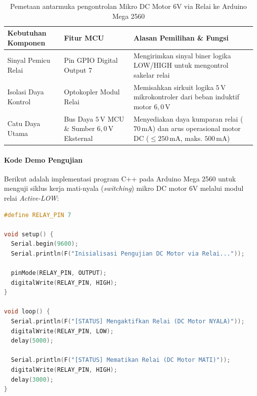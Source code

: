 \begin{table}[H]
	\centering
	\caption{Pemetaan antarmuka pengontrolan Mikro DC Motor 6V via Relai ke Arduino Mega 2560}
	\label{tab:dc_motor_relay_mcu_mapping}
	\small
	\begin{tabularx}{\textwidth}{@{} p{3.5cm} p{3.8cm} X @{}}
		\toprule
		Kebutuhan Komponen   & Fitur MCU                                                        & Alasan Pemilihan \& Fungsi                                                                                                     \\
		\midrule
		Sinyal Pemicu Relai  & Pin GPIO Digital Output 7                                        & Mengirimkan sinyal biner logika LOW/HIGH untuk mengontrol sakelar relai                                                        \\
		Isolasi Daya Kontrol & Optokopler Modul Relai                                           & Memisahkan sirkuit logika $5\,\text{V}$ mikrokontroler dari beban induktif motor $6{,}0\,\text{V}$                             \\
		Catu Daya Utama      & Bus Daya $5\,\text{V}$ MCU \& Sumber $6{,}0\,\text{V}$ Eksternal & Menyediakan daya kumparan relai ($70\,\text{mA}$) dan arus operasional motor DC ($\le 250\,\text{mA}$, maks. $500\,\text{mA}$) \\
		\bottomrule
	\end{tabularx}
\end{table}

\paragraph{Kode Demo Pengujian}
Berikut adalah implementasi program C++ pada Arduino Mega 2560 untuk menguji siklus kerja mati-nyala (\textit{switching}) mikro DC motor 6V melalui modul relai \textit{Active-LOW}:

\begin{lstlisting}[language=C++, caption={Kode program pengontrolan mikro DC motor 6V berbasis modul relai pada Arduino Mega 2560}, label={lst:dc_motor_relay_code}]
#define RELAY_PIN 7

void setup() {
  Serial.begin(9600);
  Serial.println(F("Inisialisasi Pengujian DC Motor via Relai..."));

  pinMode(RELAY_PIN, OUTPUT);
  digitalWrite(RELAY_PIN, HIGH);
}

void loop() {
  Serial.println(F("[STATUS] Mengaktifkan Relai (DC Motor NYALA)"));
  digitalWrite(RELAY_PIN, LOW);
  delay(5000);

  Serial.println(F("[STATUS] Mematikan Relai (DC Motor MATI)"));
  digitalWrite(RELAY_PIN, HIGH);
  delay(3000);
}
\end{lstlisting}

